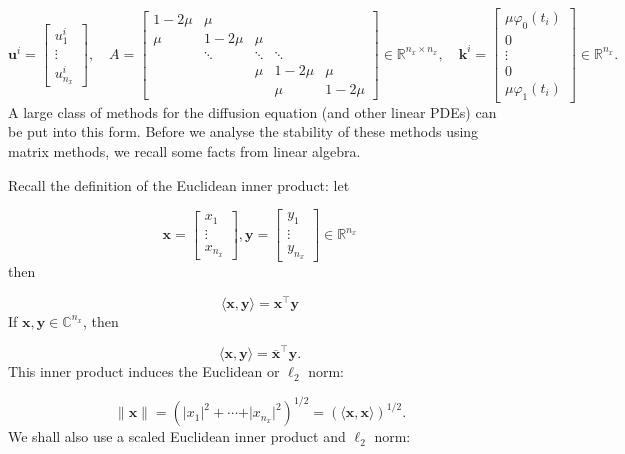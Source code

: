 \documentclass[12pt,landscape]{article}
\begin{document}
{\[
\mathbf{u}^i = \begin{bmatrix}
u^{i}_{1} \\
\vdots \\
u^{i}_{n_x}
\end{bmatrix}, \quad A = \begin{bmatrix}
1 - 2\mu & \mu & & & \\
\mu  & 1-2\mu & \mu  & & \\
      & \ddots & \ddots & \ddots & \\
      &        & \mu    & 1- 2\mu & \mu \\
      &        &        &\mu      & 1-2\mu
\end{bmatrix} \in \mathbb{R}^{n_x \times n_x}, \quad \mathbf{k}^i=
\begin{bmatrix}
\mu\varphi_0(t_i) \\
0 \\
\vdots \\
0 \\
\mu \varphi_1(t_i)
\end{bmatrix} \in \mathbb{R}^{n_x}.
\]
A large class of methods for the diffusion equation (and other linear PDEs) can be put into this form.  Before we analyse the stability of these methods using matrix methods, we recall some facts from linear algebra.

Recall the definition of the Euclidean inner product: let

\[
\mathbf{x} = \begin{bmatrix}
x_1 \\
\vdots \\
x_{n_x}
\end{bmatrix},  \mathbf{y} = \begin{bmatrix}
y_1 \\
\vdots \\
y_{n_x}
\end{bmatrix}  \in \mathbb{R}^{n_x}
\]
then

\[
\langle \mathbf{x}, \mathbf{y}\rangle = \mathbf{x}^{\top}\mathbf{y}
\]
If $\mathbf{x}, \mathbf{y} \in \mathbb{C}^{n_x}$, then

\[
\langle \mathbf{x}, \mathbf{y}\rangle = \overline{\mathbf{x}}^{\top}\mathbf{y}.
\]
This inner product induces the Euclidean or $\ell_2$ norm:

\[
\| \mathbf{x} \| = \left(\vert x_1\vert^2 + \cdots + \vert x_{n_x}\vert^2  \right)^{1/2}  = \left(\langle\mathbf{x},\mathbf{x}\rangle\right)^{1/2}.
\]
We shall also use a scaled Euclidean inner product and $\ell_2$ norm:

}
\end{document}
